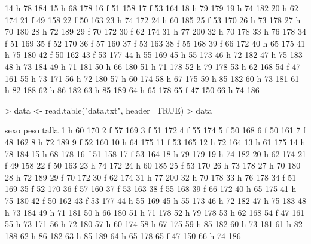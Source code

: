 \documentclass[12pt]{article}
\begin{document}
\begin{Schunk}
\begin{Soutput}
14    h   78   184
15    h   68   178
16    f   51   158
17    f   53   164
18    h   79   179
19    h   74   182
20    h   62   174
21    f   49   158
22    f   50   163
23    h   74   172
24    h   60   185
25    f   53   170
26    h   73   178
27    h   70   180
28    h   72   189
29    f   70   172
30    f   62   174
31    h   77   200
32    h   70   178
33    h   76   178
34    f   51   169
35    f   52   170
36    f   57   160
37    f   53   163
38    f   55   168
39    f   66   172
40    h   65   175
41    h   75   180
42    f   50   162
43    f   53   177
44    h   55   169
45    h   55   173
46    h   72   182
47    h   75   183
48    h   73   184
49    h   71   181
50    h   66   180
51    h   71   178
52    h   79   178
53    h   62   168
54    f   47   161
55    h   73   171
56    h   72   180
57    h   60   174
58    h   67   175
59    h   85   182
60    h   73   181
61    h   82   188
62    h   86   182
63    h   85   189
64    h   65   178
65    f   47   150
66    h   74   186
\end{Soutput}
\begin{Sinput}
> data <- read.table("data.txt", header=TRUE)
> data
\end{Sinput}
\begin{Soutput}
   sexo peso talla
1     h   60   170
2     f   57   169
3     f   51   172
4     f   55   174
5     f   50   168
6     f   50   161
7     f   48   162
8     h   72   189
9     f   52   160
10    h   64   175
11    f   53   165
12    h   72   164
13    h   61   175
14    h   78   184
15    h   68   178
16    f   51   158
17    f   53   164
18    h   79   179
19    h   74   182
20    h   62   174
21    f   49   158
22    f   50   163
23    h   74   172
24    h   60   185
25    f   53   170
26    h   73   178
27    h   70   180
28    h   72   189
29    f   70   172
30    f   62   174
31    h   77   200
32    h   70   178
33    h   76   178
34    f   51   169
35    f   52   170
36    f   57   160
37    f   53   163
38    f   55   168
39    f   66   172
40    h   65   175
41    h   75   180
42    f   50   162
43    f   53   177
44    h   55   169
45    h   55   173
46    h   72   182
47    h   75   183
48    h   73   184
49    h   71   181
50    h   66   180
51    h   71   178
52    h   79   178
53    h   62   168
54    f   47   161
55    h   73   171
56    h   72   180
57    h   60   174
58    h   67   175
59    h   85   182
60    h   73   181
61    h   82   188
62    h   86   182
63    h   85   189
64    h   65   178
65    f   47   150
66    h   74   186
\end{Soutput}
\end{Schunk}
\end{document}
